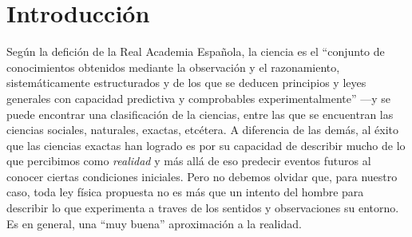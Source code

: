 \documentclass[11pt]{book}
\begin{document}
\newpage

\addtolength{\topmargin}{\MSup}



\tableofcontents
\cleardoublepage




\chapter{Introducción}


Según la defición de la Real Academia Española, la ciencia es el ``conjunto de conocimientos obtenidos mediante la observación y el razonamiento, sistemáticamente estructurados y de los que se deducen principios y leyes generales con capacidad predictiva y comprobables experimentalmente'' ---y se puede encontrar una clasificación de la ciencias, entre las que se encuentran las ciencias sociales, naturales, exactas, etcétera. %
A diferencia de las demás, al éxito que las ciencias exactas han logrado es por su capacidad de describir mucho de lo que percibimos como \emph{realidad} y más allá de eso predecir  eventos futuros al conocer ciertas condiciones iniciales. %
 Pero no debemos olvidar que, para nuestro caso, toda ley física propuesta no es más que un intento del hombre para describir lo que experimenta a traves de los sentidos y observaciones su entorno. Es en general, una ``muy buena'' aproximación a la realidad.
\end{document}
